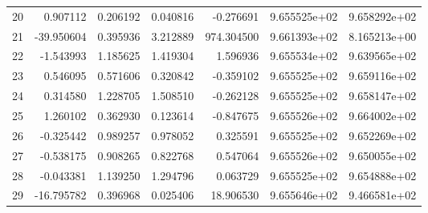 \begin{tabular}{c rrr r rr}
20 & 0.907112 & 0.206192 & 0.040816 & -0.276691 & 9.655525e+02 & 9.658292e+02 \\
21 & -39.950604 & 0.395936 & 3.212889 & 974.304500 & 9.661393e+02 & 8.165213e+00 \\
22 & -1.543993 & 1.185625 & 1.419304 & 1.596936 & 9.655534e+02 & 9.639565e+02 \\
23 & 0.546095 & 0.571606 & 0.320842 & -0.359102 & 9.655525e+02 & 9.659116e+02 \\
24 & 0.314580 & 1.228705 & 1.508510 & -0.262128 & 9.655525e+02 & 9.658147e+02 \\
25 & 1.260102 & 0.362930 & 0.123614 & -0.847675 & 9.655526e+02 & 9.664002e+02 \\
26 & -0.325442 & 0.989257 & 0.978052 & 0.325591 & 9.655525e+02 & 9.652269e+02 \\
27 & -0.538175 & 0.908265 & 0.822768 & 0.547064 & 9.655526e+02 & 9.650055e+02 \\
28 & -0.043381 & 1.139250 & 1.294796 & 0.063729 & 9.655525e+02 & 9.654888e+02 \\
29 & -16.795782 & 0.396968 & 0.025406 & 18.906530 & 9.655646e+02 & 9.466581e+02 \\
\bottomrule
\end{tabular}